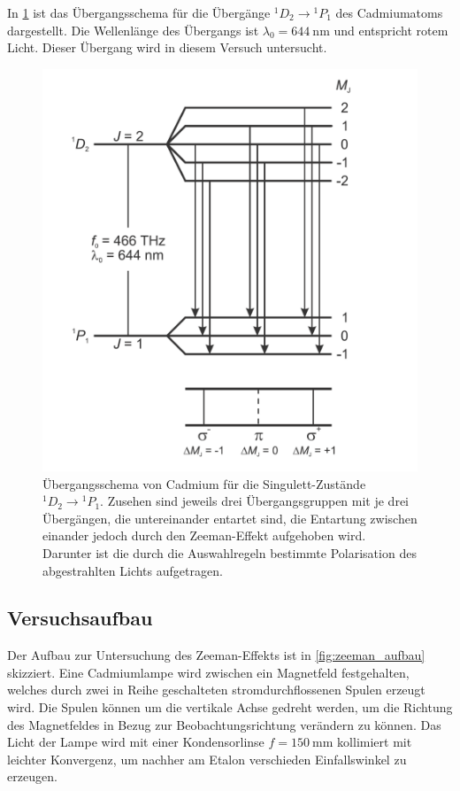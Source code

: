 In \cref{fig:zeeman_übergänge} ist das Übergangsschema für die Übergänge ${}^1D_2\rightarrow {}^1P_1$
des Cadmiumatoms dargestellt. Die Wellenlänge des Übergangs ist $\lambda_0 = \SI{644}{\nano\meter}$
und entspricht rotem Licht. Dieser Übergang wird in diesem Versuch untersucht.

\begin{figure}
    \centering
    \includegraphics[width=0.6\linewidth]{../figs/zeeman_übergänge}
    \caption{Übergangsschema von Cadmium für die Singulett-Zustände ${}^1D_2\rightarrow {}^1P_1$. 
        Zusehen sind jeweils drei Übergangsgruppen mit je drei Übergängen, die untereinander
        entartet sind, die Entartung zwischen einander jedoch durch den Zeeman-Effekt aufgehoben wird. Darunter 
        ist die durch die Auswahlregeln bestimmte Polarisation des abgestrahlten Lichts aufgetragen. 
        \cite{zeeman_handblatt}}
    \label{fig:zeeman_übergänge}
\end{figure}

\subsection{Versuchsaufbau}
Der Aufbau zur Untersuchung des Zeeman-Effekts ist in \cref{fig:zeeman_aufbau} skizziert. Eine 
Cadmiumlampe wird zwischen ein Magnetfeld festgehalten, welches durch zwei in Reihe 
geschalteten stromdurchflossenen Spulen erzeugt wird. Die Spulen können 
um die vertikale Achse gedreht werden, um die Richtung 
des Magnetfeldes in Bezug zur Beobachtungsrichtung verändern zu können. 
Das Licht der Lampe wird mit einer Kondensorlinse 
$f=\SI{150}{\mm}$ kollimiert mit leichter Konvergenz, um nachher am Etalon verschieden Einfallswinkel zu 
erzeugen. 

